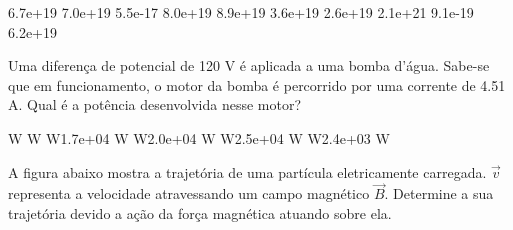 \documentclass[12pt, addpoints]{exam}
\begin{document}
\begin{questions}
\begin{multicols*}{2}
\begin{oneparchoices}
\choice 6.7e+19 \choice 7.0e+19 \choice 5.5e-17 \choice 8.0e+19 \choice 8.9e+19 \choice 3.6e+19 \choice 2.6e+19 \choice 2.1e+21 \choice 9.1e-19 \choice 6.2e+19 
\end{oneparchoices}\question Uma diferença de potencial de 120 V é aplicada a uma bomba d’água. Sabe-se que em funcionamento, o motor da bomba é percorrido por uma corrente de    4.51 A. Qual é a potência desenvolvida nesse motor?

\begin{oneparchoices}
 W W W\choice 1.7e+04 W W\choice 2.0e+04 W W\choice 2.5e+04 W W\choice 2.4e+03 W
\end{oneparchoices}\question A ﬁgura abaixo mostra a trajetória de uma partícula eletricamente carregada. $\vec{{v}}$ representa a velocidade atravessando um campo magnético $\vec{{B}}$. Determine a sua trajetória devido a ação da força magnética atuando sobre ela.
        
        \begin{center}
            \begin{minipage}[c]{0.5\linewidth}
            \end{minipage}
        \end{center}

        


\end{multicols*}
\end{questions}
\end{document}
